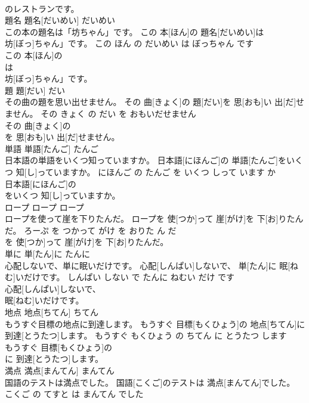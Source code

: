 \documentclass[8pt]{extreport}
\begin{document}
\begin{CJK}{UTF8}{min}
\\	のレストランです。			
\\	題名	題名[だいめい]	だいめい	
\\	この本の題名は「坊ちゃん」です。	この 本[ほん]の 題名[だいめい]は
\\	坊[ぼっ]ちゃん」です。	この ほん の だいめい は ぼっちゃん です	
\\	この 本[ほん]の
\\	は
\\	坊[ぼっ]ちゃん」です。			
\\	題	題[だい]	だい	
\\	その曲の題を思い出せません。	その 曲[きょく]の 題[だい]を 思[おも]い 出[だ]せません。	その きょく の だい を おもいだせません	
\\	その 曲[きょく]の
\\	を 思[おも]い 出[だ]せません。			
\\	単語	単語[たんご]	たんご	
\\	日本語の単語をいくつ知っていますか。	日本語[にほんご]の 単語[たんご]をいくつ 知[し]っていますか。	にほんご の たんご を いくつ しって います か	
\\	日本語[にほんご]の
\\	をいくつ 知[し]っていますか。			
\\	ロープ	ロープ	ロープ	
\\	ロープを使って崖を下りたんだ。	ロープを 使[つか]って 崖[がけ]を 下[お]りたんだ。	ろーぷ を つかって がけ を おりた ん だ	
\\	を 使[つか]って 崖[がけ]を 下[お]りたんだ。			
\\	単に	単[たん]に	たんに	
\\	心配しないで、単に眠いだけです。	心配[しんぱい]しないで、 単[たん]に 眠[ねむ]いだけです。	しんぱい しない で たんに ねむい だけ です	
\\	心配[しんぱい]しないで、
\\	眠[ねむ]いだけです。			
\\	地点	地点[ちてん]	ちてん	
\\	もうすぐ目標の地点に到達します。	もうすぐ 目標[もくひょう]の 地点[ちてん]に 到達[とうたつ]します。	もうすぐ もくひょう の ちてん に とうたつ します	
\\	もうすぐ 目標[もくひょう]の
\\	に 到達[とうたつ]します。			
\\	満点	満点[まんてん]	まんてん	
\\	国語のテストは満点でした。	国語[こくご]のテストは 満点[まんてん]でした。	こくご の てすと は まんてん でした	

\end{CJK}
\end{document}
